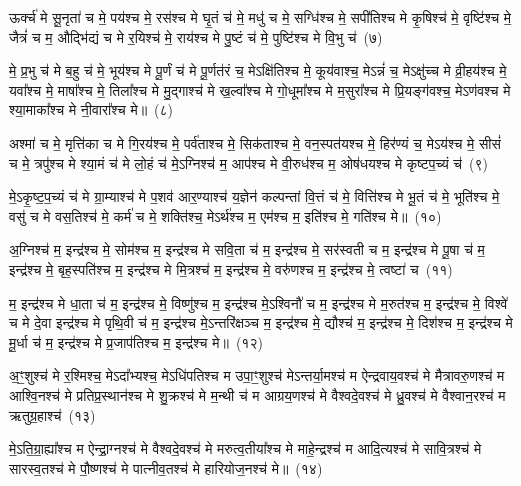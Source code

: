 {\anuvakamend[{विश्वं॑ च॒ शय॑नम॒ष्टौ च॑}]}%

ऊर्क्च॑ मे सू॒नृता॑ च मे॒ पय॑श्च मे॒ रस॑श्च मे घृ॒तं च॑ मे॒ मधु॑ च मे॒ सग्धि॑श्च मे॒ सपी॑तिश्च मे कृ॒षिश्च॑ मे॒ वृष्टि॑श्च मे॒ जैत्रं॑ च म॒ औद्भि॑द्यं च मे र॒यिश्च॑ मे॒ राय॑श्च मे पु॒ष्टं च॑ मे॒ पुष्टि॑श्च मे वि॒भु च॑~(७)

मे॒ प्र॒भु च॑ मे ब॒हु च॑ मे॒ भूय॑श्च मे पू॒र्णं च॑ मे पू॒र्णत॑रं च॒ मे\-ऽक्षि॑तिश्च मे॒ कूय॑वाश्च॒ मे\-ऽन्नं॑ च॒ मे\-ऽक्षु॑च्च मे व्री॒हय॑श्च मे॒ यवा᳚श्च मे॒ माषा᳚श्च मे॒ तिला᳚श्च मे मु॒द्गाश्च॑ मे ख॒ल्वा᳚श्च मे गो॒धूमा᳚श्च मे म॒सुरा᳚श्च मे प्रि॒यङ्ग॑वश्च॒ मे\-ऽण॑वश्च मे श्या॒माका᳚श्च मे नी॒वारा᳚श्च मे॥~(८)

{\anuvakamend[{वि॒भु च॑ म॒सुरा॒श्चतु॑र्दश च}]}%

अश्मा॑ च मे॒ मृत्ति॑का च मे गि॒रय॑श्च मे॒ पर्व॑ताश्च मे॒ सिक॑ताश्च मे॒ वन॒स्पत॑यश्च मे॒ हिर॑ण्यं च॒ मे\-ऽय॑श्च मे॒ सीसं॑ च मे॒ त्रपु॑श्च मे श्या॒मं च॑ मे लो॒हं च॑ मे॒\-ऽग्निश्च॑ म॒ आप॑श्च मे वी॒रुध॑श्च म॒ ओष॑धयश्च मे कृष्टप॒च्यं च॑~(९)

मे॒\-ऽकृ॒ष्ट॒प॒च्यं च॑ मे ग्रा॒म्याश्च॑ मे प॒शव॑ आर॒ण्याश्च॑ य॒ज्ञेन॑ कल्पन्तां वि॒त्तं च॑ मे॒ वित्ति॑श्च मे भू॒तं च॑ मे॒ भूति॑श्च मे॒ वसु॑ च मे वस॒तिश्च॑ मे॒ कर्म॑ च मे॒ शक्ति॑श्च॒ मे\-ऽर्थ॑श्च म॒ एम॑श्च म॒ इति॑श्च मे॒ गति॑श्च मे॥~(१०)

{\anuvakamend[{कृ॒ष्ट॒प॒च्यञ्चा॒ष्टाच॑त्वारिꣳशच्च}]}%

अ॒ग्निश्च॑ म॒ इन्द्र॑श्च मे॒ सोम॑श्च म॒ इन्द्र॑श्च मे सवि॒ता च॑ म॒ इन्द्र॑श्च मे॒ सर॑स्वती च म॒ इन्द्र॑श्च मे पू॒षा च॑ म॒ इन्द्र॑श्च मे॒ बृह॒स्पति॑श्च म॒ इन्द्र॑श्च मे मि॒त्रश्च॑ म॒ इन्द्र॑श्च मे॒ वरु॑णश्च म॒ इन्द्र॑श्च मे॒ त्वष्टा॑ च~(११)

म॒ इन्द्र॑श्च मे धा॒ता च॑ म॒ इन्द्र॑श्च मे॒ विष्णु॑श्च म॒ इन्द्र॑श्च मे॒\-ऽश्विनौ॑ च म॒ इन्द्र॑श्च मे म॒रुत॑श्च म॒ इन्द्र॑श्च मे॒ विश्वे॑ च मे दे॒वा इन्द्र॑श्च मे पृथि॒वी च॑ म॒ इन्द्र॑श्च मे॒\-ऽन्तरि॑क्षञ्च म॒ इन्द्र॑श्च मे॒ द्यौश्च॑ म॒ इन्द्र॑श्च मे॒ दिश॑श्च म॒ इन्द्र॑श्च मे मू॒र्धा च॑ म॒ इन्द्र॑श्च मे प्र॒जा\-प॑तिश्च म॒ इन्द्र॑श्च मे॥~(१२)

{\anuvakamend[{त्वष्टा॑ च॒ द्यौश्च॑ म॒ एक॑विꣳशतिश्च}]}%

अ॒ꣳ॒शुश्च॑ मे र॒श्मिश्च॒ मे\-ऽदा᳚भ्यश्च॒ मे\-ऽधि॑\-पतिश्च म उपा॒ꣳ॒शुश्च॑ मे\-ऽन्तर्या॒मश्च॑ म ऐन्द्रवाय॒वश्च॑ मे मैत्रावरु॒णश्च॑ म आश्वि॒नश्च॑ मे प्रतिप्र॒स्थान॑श्च मे शु॒क्रश्च॑ मे म॒न्थी च॑ म आग्रय॒णश्च॑ मे वैश्वदे॒वश्च॑ मे ध्रु॒वश्च॑ मे वैश्वान॒रश्च॑ म ऋतुग्र॒हाश्च॑~(१३)

मे॒\-ऽति॒ग्रा॒ह्या᳚श्च म ऐन्द्रा॒ग्नश्च॑ मे वैश्वदे॒वश्च॑ मे मरुत्व॒तीया᳚श्च मे माहे॒न्द्रश्च॑ म आदि॒त्यश्च॑ मे सावि॒त्रश्च॑ मे सारस्व॒तश्च॑ मे पौ॒ष्णश्च॑ मे पात्नीव॒तश्च॑ मे हारियोज॒नश्च॑ मे॥~(१४)

